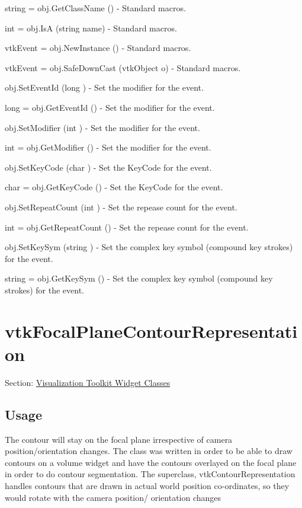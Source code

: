 \begin{DoxyItemize}
\item {\ttfamily string = obj.\-Get\-Class\-Name ()} -\/ Standard macros.  
\item {\ttfamily int = obj.\-Is\-A (string name)} -\/ Standard macros.  
\item {\ttfamily vtk\-Event = obj.\-New\-Instance ()} -\/ Standard macros.  
\item {\ttfamily vtk\-Event = obj.\-Safe\-Down\-Cast (vtk\-Object o)} -\/ Standard macros.  
\item {\ttfamily obj.\-Set\-Event\-Id (long )} -\/ Set the modifier for the event.  
\item {\ttfamily long = obj.\-Get\-Event\-Id ()} -\/ Set the modifier for the event.  
\item {\ttfamily obj.\-Set\-Modifier (int )} -\/ Set the modifier for the event.  
\item {\ttfamily int = obj.\-Get\-Modifier ()} -\/ Set the modifier for the event.  
\item {\ttfamily obj.\-Set\-Key\-Code (char )} -\/ Set the Key\-Code for the event.  
\item {\ttfamily char = obj.\-Get\-Key\-Code ()} -\/ Set the Key\-Code for the event.  
\item {\ttfamily obj.\-Set\-Repeat\-Count (int )} -\/ Set the repease count for the event.  
\item {\ttfamily int = obj.\-Get\-Repeat\-Count ()} -\/ Set the repease count for the event.  
\item {\ttfamily obj.\-Set\-Key\-Sym (string )} -\/ Set the complex key symbol (compound key strokes) for the event.  
\item {\ttfamily string = obj.\-Get\-Key\-Sym ()} -\/ Set the complex key symbol (compound key strokes) for the event.  
\end{DoxyItemize}\hypertarget{vtkwidgets_vtkfocalplanecontourrepresentation}{}\section{vtk\-Focal\-Plane\-Contour\-Representation}\label{vtkwidgets_vtkfocalplanecontourrepresentation}
Section\-: \hyperlink{sec_vtkwidgets}{Visualization Toolkit Widget Classes} \hypertarget{vtkwidgets_vtkxyplotwidget_Usage}{}\subsection{Usage}\label{vtkwidgets_vtkxyplotwidget_Usage}
The contour will stay on the focal plane irrespective of camera position/orientation changes. The class was written in order to be able to draw contours on a volume widget and have the contours overlayed on the focal plane in order to do contour segmentation. The superclass, vtk\-Contour\-Representation handles contours that are drawn in actual world position co-\/ordinates, so they would rotate with the camera position/ orientation changes

